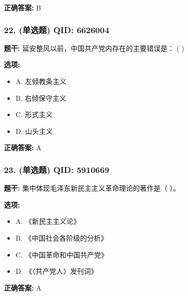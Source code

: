 \documentclass[12pt,UTF8]{ctexart}
\begin{document}
\textbf{正确答案:}
B

\vspace{0.3em}\hrulefill\vspace{0.7em}

\subsubsection*{22. (单选题) \small QID: 6626004}

\textbf{题干:}
延安整风以前，中国共产党内存在的主要错误是： ( )

\textbf{选项:}
\begin{itemize}[leftmargin=*]

  \item A. 左倾教条主义

  \item B. 右倾保守主义

  \item C. 形式主义

  \item D. 山头主义

\end{itemize}

\textbf{正确答案:}
A

\vspace{0.3em}\hrulefill\vspace{0.7em}

\subsubsection*{23. (单选题) \small QID: 5910669}

\textbf{题干:}
集中体现毛泽东新民主主义革命理论的著作是（ ）。

\textbf{选项:}
\begin{itemize}[leftmargin=*]

  \item A. 《新民主主义论》

  \item B. 《中国社会各阶级的分析》

  \item C. 《中国革命和中国共产党》

  \item D. 《〈共产党人〉发刊词》

\end{itemize}

\textbf{正确答案:}
A

\vspace{0.3em}\hrulefill\vspace{0.7em}
\end{document}
